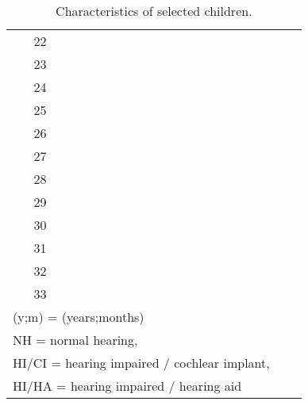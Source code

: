 \begin{table}[h!]
\begin{tabular}{| c | cccccccc |}
		\rowcolor{gray}
		22 &  &  &  &  &  &  &  &\\ 
		23 &  &  &  &  &  &  &  &\\
		\rowcolor{gray}
		24 &  &  &  &  &  &  &  &\\
		25 &  &  &  &  &  &  &  &\\
		\rowcolor{gray}
		26 &  &  &  &  &  &  &  &\\
		27 &  &  &  &  &  &  &  &\\
		\rowcolor{gray}
		28 &  &  &  &  &  &  &  &\\
		29 &  &  &  &  &  &  &  &\\
		\rowcolor{gray}
		30 &  &  &  &  &  &  &  &\\
		31 &  &  &  &  &  &  &  &\\ 
		\rowcolor{gray}
		32 &  &  &  &  &  &  &  &\\ 
		33 &  &  &  &  &  &  &  &\\
		\hline
		\multicolumn{7}{l}{\footnotesize{(y;m) = (years;months)}} \\
		\multicolumn{7}{l}{\footnotesize{NH = normal hearing,}} \\
		\multicolumn{7}{l}{\footnotesize{HI/CI = hearing impaired / cochlear implant,}} \\
		\multicolumn{7}{l}{\footnotesize{HI/HA = hearing impaired / hearing aid}}
	\end{tabular}
	\caption{Characteristics of selected children.}
	\label{tab:children_char}
\end{table}